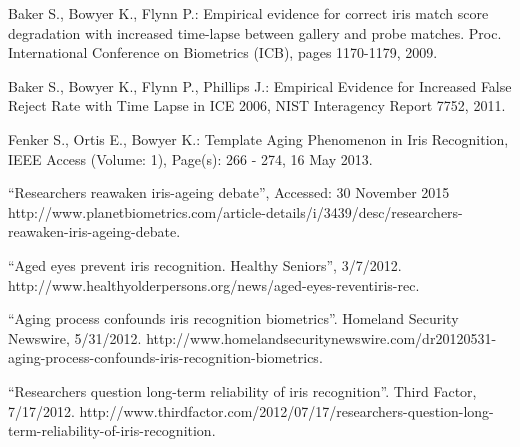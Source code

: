 \begin{thebibliography}{9}


		Baker S., Bowyer K., Flynn P.: Empirical evidence for correct iris match score degradation with increased time-lapse between gallery and probe matches. Proc. International Conference on Biometrics (ICB), pages 1170-1179, 2009. 

		Baker S., Bowyer K., Flynn P., Phillips J.: Empirical Evidence for Increased False Reject Rate with Time Lapse in ICE 2006, NIST Interagency Report 7752, 2011.

		Fenker S., Ortis E., Bowyer K.: Template Aging Phenomenon in Iris Recognition, IEEE Access  (Volume: 1), Page(s):  266 - 274, 16 May 2013.


	 ``Researchers reawaken iris-ageing debate'', Accessed: 30 November 2015  http://www.planetbiometrics.com/article-details/i/3439/desc/researchers-reawaken-iris-ageing-debate.


		``Aged eyes prevent iris recognition. Healthy Seniors'', 3/7/2012. http://www.healthyolderpersons.org/news/aged-eyes-reventiris-rec.

		``Aging process confounds iris recognition biometrics''. Homeland Security Newswire, 5/31/2012.
http://www.homelandsecuritynewswire.com/dr20120531-aging-process-confounds-iris-recognition-biometrics. 

		``Researchers question long-term reliability of iris recognition''. Third Factor, 7/17/2012. http://www.thirdfactor.com/2012/07/17/researchers-question-long-term-reliability-of-iris-recognition.


\end{thebibliography}
